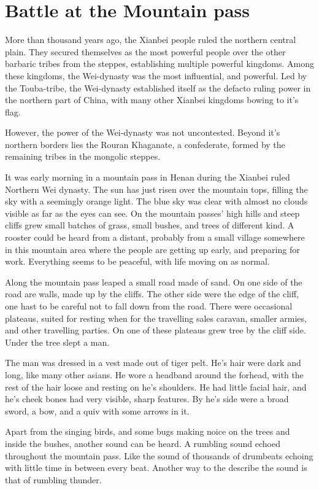 \chapter{Battle at the Mountain pass}

More than thousand years ago, the Xianbei people ruled the northern central plain. They secured themselves as the most powerful people over the other barbaric tribes from the steppes, establishing multiple powerful kingdoms. Among these kingdoms, the Wei-dynasty was the most influential, and powerful. Led by the Touba-tribe, the Wei-dynasty established itself as the defacto ruling power in the northern part of China, with many other Xianbei kingdoms bowing to it's flag.

However, the power of the Wei-dynasty was not uncontested. Beyond it's northern borders lies the Rouran Khaganate, a confederate, formed by the remaining tribes in the mongolic steppes.

It was early morning in a mountain pass in Henan during the Xianbei ruled Northern Wei dynasty. The sun has just risen over the mountain tops, filling the sky with a seemingly orange light. The blue sky was clear with almost no clouds visible as far as the eyes can see. On the mountain passes' high hills and steep cliffs grew small batches of grass, small bushes, and trees of different kind.
A rooster could be heard from a distant, probably from a small village somewhere in this mountain area where the people are getting up early, and preparing for work. Everything seems to be peaceful, with life moving on as normal.

Along the mountain pass leaped a small road made of sand. On one side of the road are walls, made up by the cliffs. The other side were the edge of the cliff, one hast to be careful not to fall down from the road. There were occasional plateaus, suited for resting when for the travelling sales caravan, smaller armies, and other travelling parties. On one of these plateaus grew tree by the cliff side. Under the tree slept a man.

The man was dressed in a vest made out of tiger pelt. He's hair were dark and long, like many other asians. He wore a headband around the forhead, with the rest of the hair loose and resting on he's shoulders. He had little facial hair, and he's cheek bones had very visible, sharp features. By he's side were a broad sword, a bow, and a quiv with some arrows in it.

Apart from the singing birds, and some bugs making noice on the trees and inside the bushes, another sound can be heard. A rumbling sound echoed throughout the mountain pass. Like the sound of thousands of drumbeats echoing with little time in between every beat. Another way to the describe the sound is that of rumbling thunder.

